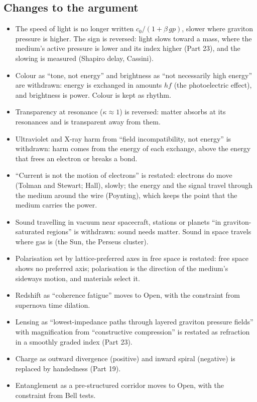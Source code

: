 \subsection*{Changes to the argument}
\begin{itemize}
\item The speed of light is no longer written $c_0/(1+\beta\,gp)$, slower where graviton pressure is higher. The sign is reversed: light slows toward a mass, where the medium's active pressure is lower and its index higher (Part 23), and the slowing is measured (Shapiro delay, Cassini).
\item Colour as ``tone, not energy'' and brightness as ``not necessarily high energy'' are withdrawn: energy is exchanged in amounts $hf$ (the photoelectric effect), and brightness is power. Colour is kept as rhythm.
\item Transparency at resonance ($\kappa \approx 1$) is reversed: matter absorbs at its resonances and is transparent away from them.
\item Ultraviolet and X-ray harm from ``field incompatibility, not energy'' is withdrawn: harm comes from the energy of each exchange, above the energy that frees an electron or breaks a bond.
\item ``Current is not the motion of electrons'' is restated: electrons do move (Tolman and Stewart; Hall), slowly; the energy and the signal travel through the medium around the wire (Poynting), which keeps the point that the medium carries the power.
\item Sound travelling in vacuum near spacecraft, stations or planets ``in graviton-saturated regions'' is withdrawn: sound needs matter. Sound in space travels where gas is (the Sun, the Perseus cluster).
\item Polarisation set by lattice-preferred axes in free space is restated: free space shows no preferred axis; polarisation is the direction of the medium's sideways motion, and materials select it.
\item Redshift as ``coherence fatigue'' moves to Open, with the constraint from supernova time dilation.
\item Lensing as ``lowest-impedance paths through layered graviton pressure fields'' with magnification from ``constructive compression'' is restated as refraction in a smoothly graded index (Part 23).
\item Charge as outward divergence (positive) and inward spiral (negative) is replaced by handedness (Part 19).
\item Entanglement as a pre-structured corridor moves to Open, with the constraint from Bell tests.

\end{itemize}
